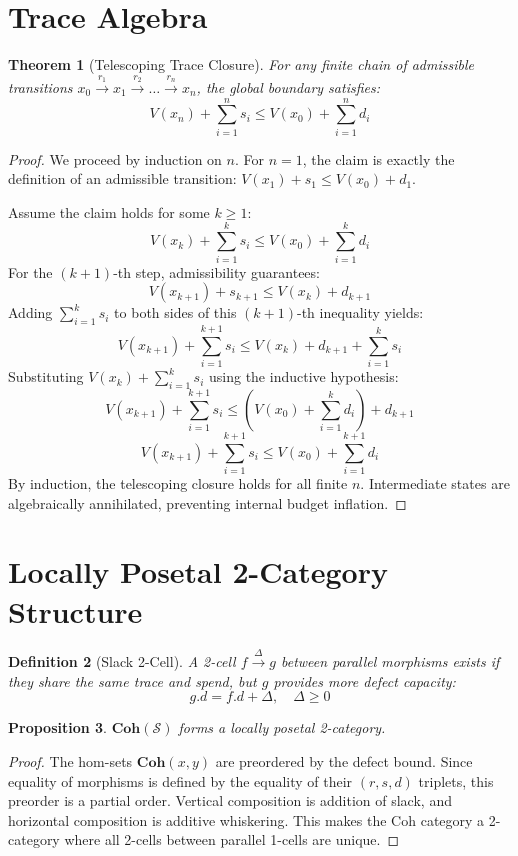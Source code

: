 \documentclass[11pt]{article}
\newtheorem{theorem}{Theorem}[section]
\newtheorem{definition}[theorem]{Definition}
\newtheorem{proposition}[theorem]{Proposition}
\begin{document}
\section{Trace Algebra}

\begin{theorem}[Telescoping Trace Closure]
For any finite chain of admissible transitions $x_0 \xrightarrow{r_1} x_1 \xrightarrow{r_2} \dots \xrightarrow{r_n} x_n$, the global boundary satisfies:
\[
V(x_n)+\sum_{i=1}^n s_i \le V(x_0)+\sum_{i=1}^n d_i
\]
\end{theorem}
\begin{proof}
We proceed by induction on $n$. 
For $n=1$, the claim is exactly the definition of an admissible transition:
$V(x_1) + s_1 \le V(x_0) + d_1$.

Assume the claim holds for some $k \ge 1$:
\[
V(x_k) + \sum_{i=1}^k s_i \le V(x_0) + \sum_{i=1}^k d_i
\]
For the $(k+1)$-th step, admissibility guarantees:
\[
V(x_{k+1}) + s_{k+1} \le V(x_k) + d_{k+1}
\]
Adding $\sum_{i=1}^k s_i$ to both sides of this $(k+1)$-th inequality yields:
\[
V(x_{k+1}) + \sum_{i=1}^{k+1} s_i \le V(x_k) + d_{k+1} + \sum_{i=1}^k s_i
\]
Substituting $V(x_k) + \sum_{i=1}^k s_i$ using the inductive hypothesis:
\[
V(x_{k+1}) + \sum_{i=1}^{k+1} s_i \le \left( V(x_0) + \sum_{i=1}^k d_i \right) + d_{k+1}
\]
\[
V(x_{k+1}) + \sum_{i=1}^{k+1} s_i \le V(x_0) + \sum_{i=1}^{k+1} d_i
\]
By induction, the telescoping closure holds for all finite $n$. Intermediate states are algebraically annihilated, preventing internal budget inflation.
\end{proof}

\section{Locally Posetal 2-Category Structure}

\begin{definition}[Slack 2-Cell]
A 2-cell $f \xrightarrow{\Delta} g$ between parallel morphisms exists if they share the same trace and spend, but $g$ provides more defect capacity:
\[
g.d = f.d + \Delta, \quad \Delta \ge 0
\]
\end{definition}

\begin{proposition}
$\mathbf{Coh}(\mathcal{S})$ forms a locally posetal 2-category.
\end{proposition}
\begin{proof}
The hom-sets $\mathbf{Coh}(x, y)$ are preordered by the defect bound. Since equality of morphisms is defined by the equality of their $(r, s, d)$ triplets, this preorder is a partial order. Vertical composition is addition of slack, and horizontal composition is additive whiskering. This makes the Coh category a 2-category where all 2-cells between parallel 1-cells are unique.
\end{proof}
\end{document}

